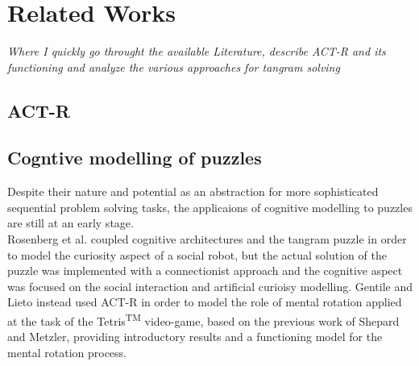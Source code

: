 \documentclass[a4paper,singleside,12pt]{report} %
\begin{document}
    
    \chapter{Related Works}
    \textit{Where I quickly go throught the available Literature, describe ACT-R and its functioning and analyze the 
	various approaches for tangram solving}
	\section{ACT-R}
	\section{Cogntive modelling of puzzles}
	Despite their nature and potential as an abstraction for more sophisticated sequential problem solving tasks,
	the applicaions of cognitive modelling to puzzles are still at an early stage.\\
	Rosenberg et al. \cite{social-robot} coupled cognitive architectures and the tangram puzzle	in order to model 
	the curiosity aspect of a social robot, but the actual solution of the puzzle was implemented with a connectionist approach
	and the cognitive aspect was focused on the social interaction and artificial curioisy modelling.
	Gentile and Lieto \cite{GENTILE20221} instead used ACT-R in order to model the role of mental rotation applied at the task of
	the Tetris\textsuperscript{TM} video-game, based on the previous work of Shepard and Metzler\cite{shepard1971mental}, providing
	introductory results and a functioning model for the mental rotation process.
\end{document}
